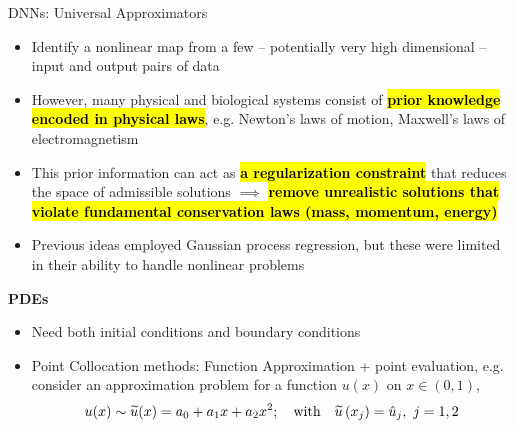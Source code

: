 \documentclass[xcolor=dvipsnames,10pt]{beamer}
\makeatletter
\let\HL\hl
\renewcommand\hl{%
  \let\set@color\beamerorig@set@color
  \let\reset@color\beamerorig@reset@color
  \HL}
\makeatother
\begin{document}
\begin{frame}[t]{DNNs: Universal Approximators}
  \begin{itemize}
    \item<1-> Identify a nonlinear map from a few -- potentially very high dimensional -- input and output pairs of data
    \item<2-> However, many physical and biological systems consist of \hl{\bf prior knowledge encoded in physical laws}, e.g. Newton's laws of motion, Maxwell's laws of electromagnetism
    \item<3-> This prior information can act as \hl{\bf a regularization constraint} that reduces the space of admissible solutions $\implies$ \hl{\bf remove unrealistic solutions that violate fundamental conservation laws (mass, momentum, energy)}
    \item<4-> Previous ideas employed Gaussian process regression, but these were limited in their ability to handle nonlinear problems
  \end{itemize}

{\bf PDEs}
\begin{itemize}
  \item<5-> Need both initial conditions and boundary conditions
  \item<6-> Point Collocation methods: Function Approximation + point evaluation, e.g. consider an approximation problem for a function $u(x)$ on $x\in (0,1)$,
  $$
    u(x)\sim \widetilde{u}(x) = a_0 + a_1 x + a_2 x^2;\quad \text{with} \quad \widetilde{u}\left(x_j\right) = \hat{u}_j,\, \, j=1,2
  $$
\end{itemize}
\end{frame}
\end{document}
